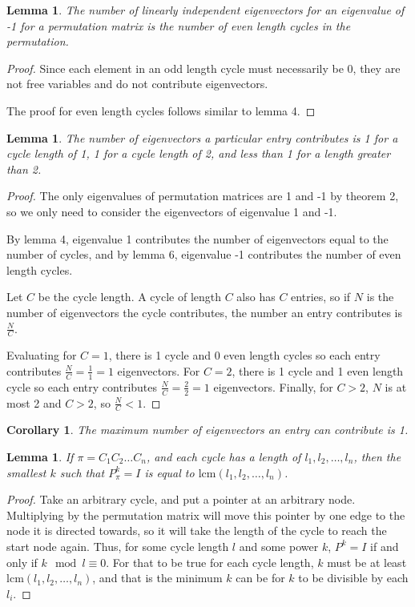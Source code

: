 \documentclass[11pt, oneside]{article}
\theoremstyle{plain}
\newtheorem{corollary}{Corollary}[theorem]
\newtheorem{lemma}[theorem]{Lemma}
\theoremstyle{definition}
\begin{document}
\begin{lemma}
The number of linearly independent eigenvectors for an eigenvalue of -1 for a permutation matrix
is the number of even length cycles in the permutation.
\end{lemma}

\begin{proof}
Since each element in an odd length cycle must necessarily be 0,
they are not free variables and do not contribute eigenvectors.

The proof for even length cycles follows similar to lemma 4.
\end{proof}

\begin{lemma}
The number of eigenvectors a particular entry contributes is 1 for a cycle length of 1,
1 for a cycle length of 2, and less than 1 for a length greater than 2.
\end{lemma}
\begin{proof}
The only eigenvalues of permutation matrices are 1 and -1 by theorem 2,
so we only need to consider the eigenvectors of eigenvalue 1 and -1.

By lemma 4, eigenvalue 1 contributes the number of eigenvectors equal to
the number of cycles, and by lemma 6, eigenvalue -1 contributes the
number of even length cycles.

Let \( C \) be the cycle length. A cycle of length \( C \) also has \( C \)
entries, so if \( N \) is the number of eigenvectors the cycle contributes,
the number an entry contributes is \( \frac{N}{C} \).

Evaluating for \( C = 1 \), there is 1 cycle and 0 even length cycles so
each entry contributes \( \frac{N}{C} = \frac{1}{1} = 1 \) eigenvectors.
For \( C = 2 \), there is 1 cycle and 1 even length cycle so each entry
contributes \( \frac{N}{C} = \frac{2}{2} = 1 \) eigenvectors.
Finally, for \( C > 2 \), \( N \) is at most 2 and \( C > 2 \), so
\( \frac{N}{C} < 1 \).
\end{proof}

\begin{corollary}
The maximum number of eigenvectors an entry can contribute is 1.
\end{corollary}

\newpage

\begin{lemma}
If \( \pi = C_1 C_2 \ldots C_n \), and each cycle
has a length of \( l_1, l_2, \ldots, l_n \),
then the smallest \( k \) such that \( P_{\pi}^k = I \)
is equal to \( \mathrm{lcm }(l_1, l_2, \ldots, l_n) \).
\end{lemma}
\begin{proof}
Take an arbitrary cycle, and put a pointer at an arbitrary node. Multiplying
by the permutation matrix will move this pointer by one edge to the node
it is directed towards, so it will take the length of the cycle to
reach the start node again. Thus, for some cycle length \( l \) and some power \( k \),
\( P^k = I \) if and only if \( k \mod l \equiv 0 \). For that to be true for each
cycle length, \( k \) must be at least \( \mathrm{lcm }(l_1, l_2, \ldots, l_n) \),
and that is the minimum \( k \) can be for \( k \) to be divisible by each \( l_i \).
\end{proof}
\end{document}

